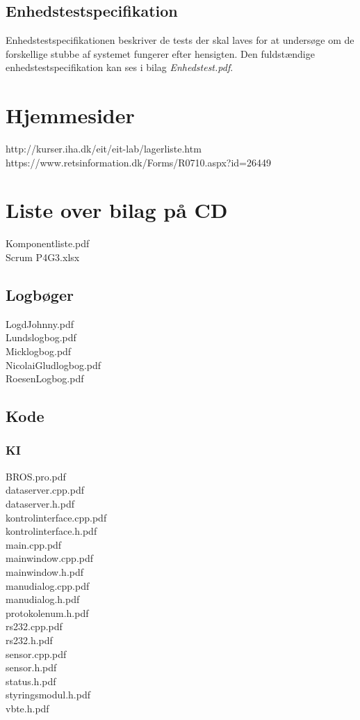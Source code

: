 \subsection{Enhedstestspecifikation}
Enhedstestspecifikationen beskriver de tests der skal laves for at undersøge om de forskellige stubbe af systemet fungerer efter hensigten. Den fuldstændige enhedstestspecifikation kan ses i bilag \textit{Enhedstest.pdf}.

\section{Hjemmesider}
http://kurser.iha.dk/eit/eit-lab/lagerliste.htm\\
https://www.retsinformation.dk/Forms/R0710.aspx?id=26449\\

\section{Liste over bilag på CD}
Komponentliste.pdf\\
Scrum P4G3.xlsx\\
\subsection{Logbøger}
LogdJohnny.pdf\\
Lundslogbog.pdf\\
Micklogbog.pdf\\
NicolaiGludlogbog.pdf\\
RoesenLogbog.pdf\\
\subsection{Kode}
\subsubsection{KI}
BROS.pro.pdf\\
dataserver.cpp.pdf\\
dataserver.h.pdf\\
kontrolinterface.cpp.pdf\\
kontrolinterface.h.pdf\\
main.cpp.pdf\\
mainwindow.cpp.pdf\\
mainwindow.h.pdf\\
manudialog.cpp.pdf\\
manudialog.h.pdf\\
protokolenum.h.pdf\\
rs232.cpp.pdf\\
rs232.h.pdf\\
sensor.cpp.pdf\\
sensor.h.pdf\\
status.h.pdf\\
styringsmodul.h.pdf\\
vbte.h.pdf
